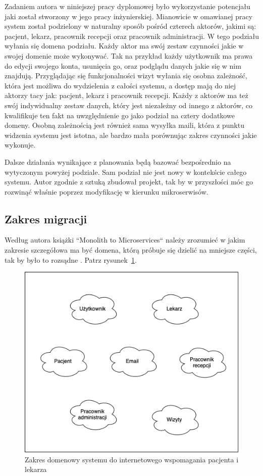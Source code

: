 \documentclass[12pt,twoside]{book}
\newcommand{\captionvspace}{\vspace{6pt}}
\begin{document}
    Zadaniem autora w niniejszej pracy dyplomowej było wykorzystanie potencjału jaki został stworzony w jego pracy inżynierskiej. Mianowicie w omawianej pracy system został podzielony w naturalny sposób pośród czterech aktorów, jakimi są: pacjent, lekarz, pracownik recepcji oraz pracownik administracji. W tego podziału wyłania się domena podziału. Każdy aktor ma swój zestaw czynności jakie w swojej domenie może wykonywać. Tak na przykład każdy użytkownik ma prawa do edycji swojego konta, usunięcia go, oraz podglądu danych jakie się w nim znajdują. Przyglądając się funkcjonalności wizyt wyłania się osobna zależność, która jest możliwa do wydzielenia z całości systemu, a dostęp mają do niej aktorzy tacy jak: pacjent, lekarz i pracownik recepcji. Każdy z aktorów ma też swój indywidualny zestaw danych, który jest niezależny od innego z aktorów, co kwalifikuje ten fakt na uwzględnienie go jako podział na cztery dodatkowe domeny. Osobną zależnością jest również sama wysyłka maili, która z punktu widzenia systemu jest istotna, ale bardzo mała porównując zakres czynności jakie wykonuje.

    Dalsze działania wynikające z planowania będą bazować bezpośrednio na wytyczonym powyżej podziale. Sam podział nie jest nowy w kontekście całego systemu. Autor zgodnie z sztuką zbudował projekt, tak by w przyszłości móc go rozwinąć właśnie poprzez modyfikację w kierunku mikroserwisów.

    \subsection{Zakres migracji}
    Według autora książki “Monolith to Microservices“ należy zrozumieć w jakim zakresie szczegółowa ma być domena, którą próbuje się dzielić na mniejsze części, tak by było to rozsądne \cite{monolith.to.microservices}. Patrz rysunek~\ref{fig:ddd-sdiwpil}.

    \begin{figure}[ht]
        \centering
        \includegraphics[width=\textwidth]{includes/images/ddd-sdiwpil.png}
        \captionvspace
        \caption{Zakres domenowy systemu do internetowego wspomagania pacjenta i lekarza}
        \label{fig:ddd-sdiwpil}
    \end{figure}
\end{document}
